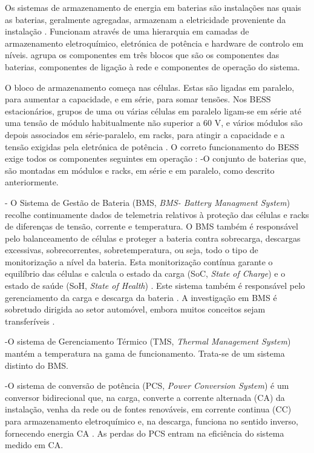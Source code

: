 Os sistemas de armazenamento de energia em baterias são instalações nas quais as baterias, geralmente agregadas, armazenam a eletricidade proveniente da instalação \cite{enel_bess}. Funcionam através de uma hierarquia em camadas de armazenamento eletroquímico, eletrónica de potência e hardware de controlo em níveis. \textcite{ Hesse2017} agrupa os componentes em três blocos que são os componentes das baterias, componentes de ligação à rede e componentes de operação do sistema.

O bloco de armazenamento começa nas células. Estas são ligadas em paralelo, para aumentar a capacidade, e em série, para somar tensões. Nos BESS estacionários, grupos de uma ou várias células em paralelo ligam-se em série até uma tensão de módulo habitualmente não superior a 60 V, e vários módulos são depois associados em série-paralelo, em racks, para atingir a capacidade e a tensão exigidas pela eletrónica de potência \cite{ KWABENAAKYEREMEH2026}\cite{ Khalid2021}\cite{ Hesse2017}. O correto funcionamento do BESS exige todos os componentes seguintes em operação \cite{Tycorun2025 }:
-O conjunto de baterias que, são montadas em módulos e racks, em série e em paralelo, como descrito anteriormente.

- O Sistema de Gestão de Bateria (BMS, \textit{BMS- Battery Managment System}) recolhe continuamente dados de telemetria relativos à proteção das células e racks de diferenças de tensão, corrente e temperatura. O BMS também é responsável pelo balanceamento de células e proteger a bateria contra sobrecarga, descargas excessivas, sobrecorrentes, sobretemperatura, ou seja, todo o tipo de monitorização a nível da bateria. Esta monitorização contínua garante o equilíbrio das células e calcula o estado da carga (SoC, \textit{State of Charge}) e o estado de saúde (SoH, \textit{State of Health}) \cite{ KWABENAAKYEREMEH2026}\cite{ Khalid2021}\cite{ MARCOSTECCA2020}. Este sistema também é responsável pelo gerenciamento da carga e descarga da bateria \cite{Tycorun2025 }.  A investigação em BMS é sobretudo dirigida ao setor automóvel, embora muitos conceitos sejam transferíveis \cite{ Hesse2017}. 

-O sistema de Gerenciamento Térmico (TMS, \textit{Thermal Management System}) mantém a temperatura na gama de funcionamento. Trata-se de um sistema distinto do BMS. 

-O sistema de conversão de potência (PCS, \textit{Power Conversion System}) é um conversor bidirecional que, na carga, converte a corrente alternada (CA) da instalação, venha da rede ou de fontes renováveis, em corrente continua (CC) para armazenamento eletroquímico e, na descarga, funciona no sentido inverso, fornecendo energia CA \cite{ KWABENAAKYEREMEH2026}\cite{ Khalid2021}\cite{Tycorun2025 }. As perdas do PCS entram na eficiência do sistema medido em CA. 


